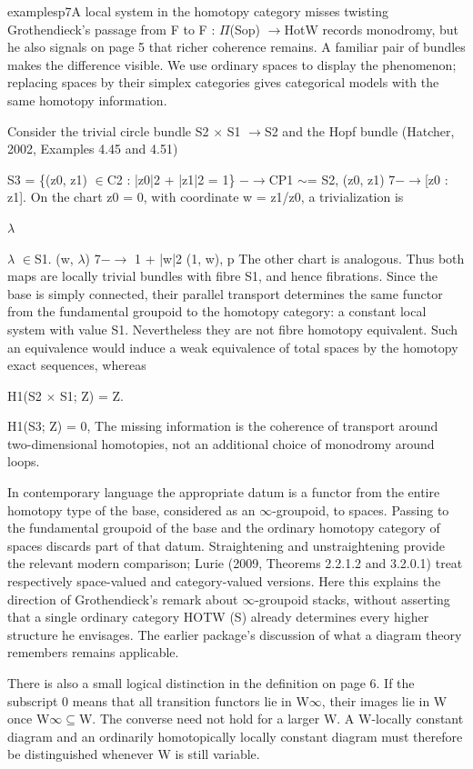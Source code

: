 \begin{dcomment}{examples}{p7}{A local system in the homotopy category misses twisting}
Grothendieck’s passage from F to F\textasciimacron{} : \ensuremath{\Pi}(Sop) \ensuremath{\to}HotW records monodromy, but he also signals on page 5 that richer coherence remains. A familiar pair of bundles makes the difference visible. We use ordinary spaces to display the phenomenon; replacing spaces by their simplex categories gives categorical models with the same homotopy information.

Consider the trivial circle bundle S2 \ensuremath{\times} S1 \ensuremath{\to}S2 and the Hopf bundle (Hatcher, 2002, Examples 4.45 and 4.51)

S3 = \{(z0, z1) \ensuremath{\in}C2 : |z0|2 + |z1|2 = 1\} \ensuremath{-}\ensuremath{\to}CP1 \ensuremath{\sim}= S2, (z0, z1) 7\ensuremath{-}\ensuremath{\to}[z0 : z1]. On the chart z0 = 0, with coordinate w = z1/z0, a trivialization is

\ensuremath{\lambda}

\ensuremath{\lambda} \ensuremath{\in}S1. (w, \ensuremath{\lambda}) 7\ensuremath{-}\ensuremath{\to} 1 + |w|2 (1, w), p The other chart is analogous. Thus both maps are locally trivial bundles with fibre S1, and hence fibrations. Since the base is simply connected, their parallel transport determines the same functor from the fundamental groupoid to the homotopy category: a constant local system with value S1. Nevertheless they are not fibre homotopy equivalent. Such an equivalence would induce a weak equivalence of total spaces by the homotopy exact sequences, whereas

H1(S2 \ensuremath{\times} S1; Z) = Z.

H1(S3; Z) = 0, The missing information is the coherence of transport around two-dimensional homotopies, not an additional choice of monodromy around loops.

In contemporary language the appropriate datum is a functor from the entire homotopy type of the base, considered as an \ensuremath{\infty}-groupoid, to spaces. Passing to the fundamental groupoid of the base and the ordinary homotopy category of spaces discards part of that datum. Straightening and unstraightening provide the relevant modern comparison; Lurie (2009, Theorems 2.2.1.2 and 3.2.0.1) treat respectively space-valued and category-valued versions. Here this explains the direction of Grothendieck’s remark about \ensuremath{\infty}-groupoid stacks, without asserting that a single ordinary category HOTW (S) already determines every higher structure he envisages. The earlier package’s discussion of what a diagram theory remembers remains applicable.

There is also a small logical distinction in the definition on page 6. If the subscript 0 means that all transition functors lie in W\ensuremath{\infty}, their images lie in W once W\ensuremath{\infty}\ensuremath{\subseteq}W. The converse need not hold for a larger W. A W-locally constant diagram and an ordinarily homotopically locally constant diagram must therefore be distinguished whenever W is still variable.

\end{dcomment}

